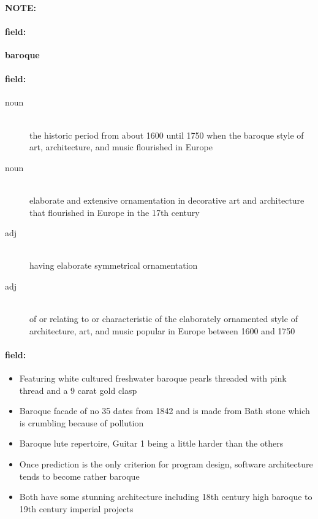 \documentclass[12pt]{article}
\newenvironment{note}{\paragraph{NOTE:}}{}
\newenvironment{field}{\paragraph{field:}}{}
\begin{document}
\begin{note}
\begin{field}
\textbf{\large baroque}
\end{field}


\begin{field}
\begin{description}
\item[noun] \hfill \\ 
the historic period from about 1600 until 1750 when the baroque style of art, architecture, and music flourished in Europe

\item[noun] \hfill \\ 
elaborate and extensive ornamentation in decorative art and architecture that flourished in Europe in the 17th century

\item[adj] \hfill \\ 
having elaborate symmetrical ornamentation

\item[adj] \hfill \\ 
of or relating to or characteristic of the elaborately ornamented style of architecture, art, and music popular in Europe between 1600 and 1750

\end{description}
\end{field}

\begin{field}
\begin{itemize}
\item Featuring white cultured freshwater baroque pearls threaded with pink thread and a 9 carat gold clasp
\item Baroque facade of no 35 dates from 1842 and is made from Bath stone which is crumbling because of pollution
\item Baroque lute repertoire, Guitar 1 being a little harder than the others
\item Once prediction is the only criterion for program design, software architecture tends to become rather baroque
\item Both have some stunning architecture including 18th century high baroque to 19th century imperial projects
\end{itemize}
\end{field}
\end{note}
\end{document}
